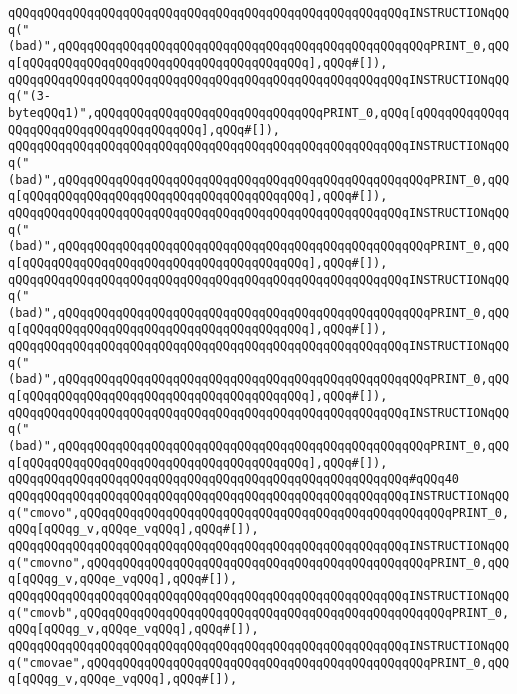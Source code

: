 \verb|qQQqqQQqqQQqqQQqqQQqqQQqqQQqqQQqqQQqqQQqqQQqqQQqqQQqqQQqINSTRUCTIONqQQq("(bad)",qQQqqQQqqQQqqQQqqQQqqQQqqQQqqQQqqQQqqQQqqQQqqQQqqQQqPRINT_0,qQQq[qQQqqQQqqQQqqQQqqQQqqQQqqQQqqQQqqQQqqQQq],qQQq#[]),|\newline
\verb|qQQqqQQqqQQqqQQqqQQqqQQqqQQqqQQqqQQqqQQqqQQqqQQqqQQqqQQqINSTRUCTIONqQQq("(3-byteqQQq1)",qQQqqQQqqQQqqQQqqQQqqQQqqQQqqQQqPRINT_0,qQQq[qQQqqQQqqQQqqQQqqQQqqQQqqQQqqQQqqQQqqQQq],qQQq#[]),|\newline
\verb|qQQqqQQqqQQqqQQqqQQqqQQqqQQqqQQqqQQqqQQqqQQqqQQqqQQqqQQqINSTRUCTIONqQQq("(bad)",qQQqqQQqqQQqqQQqqQQqqQQqqQQqqQQqqQQqqQQqqQQqqQQqqQQqPRINT_0,qQQq[qQQqqQQqqQQqqQQqqQQqqQQqqQQqqQQqqQQqqQQq],qQQq#[]),|\newline
\verb|qQQqqQQqqQQqqQQqqQQqqQQqqQQqqQQqqQQqqQQqqQQqqQQqqQQqqQQqINSTRUCTIONqQQq("(bad)",qQQqqQQqqQQqqQQqqQQqqQQqqQQqqQQqqQQqqQQqqQQqqQQqqQQqPRINT_0,qQQq[qQQqqQQqqQQqqQQqqQQqqQQqqQQqqQQqqQQqqQQq],qQQq#[]),|\newline
\verb|qQQqqQQqqQQqqQQqqQQqqQQqqQQqqQQqqQQqqQQqqQQqqQQqqQQqqQQqINSTRUCTIONqQQq("(bad)",qQQqqQQqqQQqqQQqqQQqqQQqqQQqqQQqqQQqqQQqqQQqqQQqqQQqPRINT_0,qQQq[qQQqqQQqqQQqqQQqqQQqqQQqqQQqqQQqqQQqqQQq],qQQq#[]),|\newline
\verb|qQQqqQQqqQQqqQQqqQQqqQQqqQQqqQQqqQQqqQQqqQQqqQQqqQQqqQQqINSTRUCTIONqQQq("(bad)",qQQqqQQqqQQqqQQqqQQqqQQqqQQqqQQqqQQqqQQqqQQqqQQqqQQqPRINT_0,qQQq[qQQqqQQqqQQqqQQqqQQqqQQqqQQqqQQqqQQqqQQq],qQQq#[]),|\newline
\verb|qQQqqQQqqQQqqQQqqQQqqQQqqQQqqQQqqQQqqQQqqQQqqQQqqQQqqQQqINSTRUCTIONqQQq("(bad)",qQQqqQQqqQQqqQQqqQQqqQQqqQQqqQQqqQQqqQQqqQQqqQQqqQQqPRINT_0,qQQq[qQQqqQQqqQQqqQQqqQQqqQQqqQQqqQQqqQQqqQQq],qQQq#[]),|\newline
\verb|qQQqqQQqqQQqqQQqqQQqqQQqqQQqqQQqqQQqqQQqqQQqqQQqqQQqqQQq#qQQq40|\newline
\verb|qQQqqQQqqQQqqQQqqQQqqQQqqQQqqQQqqQQqqQQqqQQqqQQqqQQqqQQqINSTRUCTIONqQQq("cmovo",qQQqqQQqqQQqqQQqqQQqqQQqqQQqqQQqqQQqqQQqqQQqqQQqqQQqPRINT_0,qQQq[qQQqg_v,qQQqe_vqQQq],qQQq#[]),|\newline
\verb|qQQqqQQqqQQqqQQqqQQqqQQqqQQqqQQqqQQqqQQqqQQqqQQqqQQqqQQqINSTRUCTIONqQQq("cmovno",qQQqqQQqqQQqqQQqqQQqqQQqqQQqqQQqqQQqqQQqqQQqqQQqPRINT_0,qQQq[qQQqg_v,qQQqe_vqQQq],qQQq#[]),|\newline
\verb|qQQqqQQqqQQqqQQqqQQqqQQqqQQqqQQqqQQqqQQqqQQqqQQqqQQqqQQqINSTRUCTIONqQQq("cmovb",qQQqqQQqqQQqqQQqqQQqqQQqqQQqqQQqqQQqqQQqqQQqqQQqqQQqPRINT_0,qQQq[qQQqg_v,qQQqe_vqQQq],qQQq#[]),|\newline
\verb|qQQqqQQqqQQqqQQqqQQqqQQqqQQqqQQqqQQqqQQqqQQqqQQqqQQqqQQqINSTRUCTIONqQQq("cmovae",qQQqqQQqqQQqqQQqqQQqqQQqqQQqqQQqqQQqqQQqqQQqqQQqPRINT_0,qQQq[qQQqg_v,qQQqe_vqQQq],qQQq#[]),|\newline
